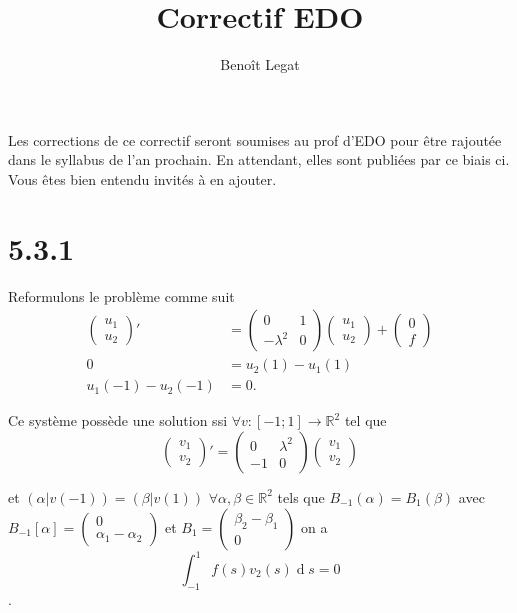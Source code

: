 \documentclass[fontsize=12pt]{article}
\title{Correctif EDO}
\author{Benoît Legat}
\DeclareMathOperator{\newdiff}{d} %
\newcommand{\dif}{\newdiff\!}
\begin{document}
\maketitle

Les corrections de ce correctif seront soumises au prof d'EDO pour
être rajoutée dans le syllabus de l'an prochain.
En attendant, elles sont publiées par ce biais ci.
Vous êtes bien entendu invités à en ajouter.

\section*{5.3.1}
Reformulons le problème comme suit
\begin{align*}
\begin{pmatrix}
  u_1\\u_2
\end{pmatrix}' & =
\begin{pmatrix}
  0 & 1\\-\lambda^2 & 0
\end{pmatrix}
\begin{pmatrix}
  u_1\\u_2
\end{pmatrix}
+
\begin{pmatrix}
  0\\f
\end{pmatrix}\\
0 & =  u_2(1) - u_1(1)\\
u_1(-1) - u_2(-1) & = 0.
\end{align*}

Ce système possède une solution
ssi $\forall v: [-1;1] \to \mathbb{R}^2$ tel que
\[\begin{pmatrix}
  v_1\\v_2
\end{pmatrix}' =
\begin{pmatrix}
  0 & \lambda^2\\-1 & 0
\end{pmatrix} 
\begin{pmatrix}v_1\\v_2
\end{pmatrix}\]

et $(\alpha|v(-1)) = (\beta|v(1))$ $\forall \alpha,\beta \in\mathbb{R}^2$
tels que $B_{-1}(\alpha) = B_1(\beta)$
avec $B_{-1}[\alpha] =
\begin{pmatrix}
  0\\\alpha_1-\alpha_2
\end{pmatrix}$ et
$B_1 =
\begin{pmatrix}
  \beta_2-\beta_1\\0
\end{pmatrix}$
on a
\[ \int_{-1}^1 f(s)v_2(s) \dif s = 0 \].
\end{document}
